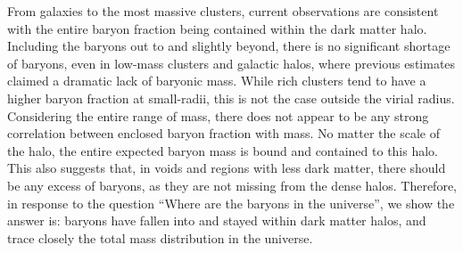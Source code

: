 From galaxies to the most massive clusters, current observations are
consistent with the entire baryon fraction being contained within the
dark matter halo. Including the baryons out to \rvir{} and slightly
beyond, there is no significant shortage of baryons, even in low-mass
clusters and galactic halos, where previous estimates claimed a
dramatic lack of baryonic mass. While rich clusters tend to have a
higher baryon fraction at small-radii, this is not the case outside
the virial radius. Considering the entire range of mass, there does
not appear to be any strong correlation between enclosed baryon
fraction with mass. No matter the scale of the halo, the entire
expected baryon mass is bound and contained to this halo. This also
suggests that, in voids and regions with less dark matter, there
should be any excess of baryons, as they are not missing from the
dense halos. Therefore, in response to the question ``Where are the
baryons in the universe'', we show the answer is: baryons have fallen
into and stayed within dark matter halos, and trace closely the total
mass distribution in the universe. 


